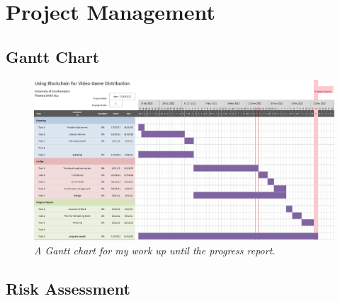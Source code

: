 
\chapter{Project Management}

\section{Gantt Chart}

\begin{figure}[ht]
  \includegraphics[width=\textwidth]{diagrams/gantt-chart-1.png}
  \caption{\textit{A Gantt chart for my work up until the progress report.}}
\end{figure}


\section{Risk Assessment}

